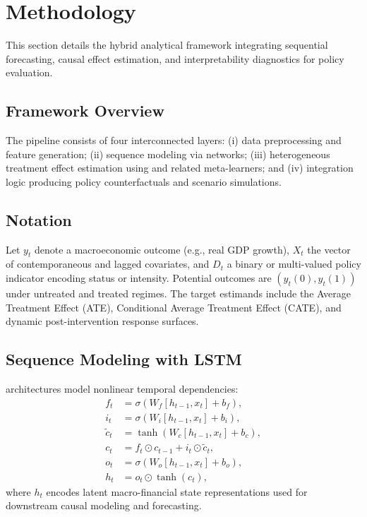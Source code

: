 \section{Methodology}\label{sec:methodology}
This section details the hybrid analytical framework integrating sequential forecasting, causal effect estimation, and interpretability diagnostics for \VAT{} policy evaluation.

\subsection{Framework Overview}
The pipeline consists of four interconnected layers: (i) data preprocessing and feature generation; (ii) sequence modeling via \LSTM{} networks; (iii) heterogeneous treatment effect estimation using \CF{} and related meta-learners; and (iv) integration logic producing policy counterfactuals and scenario simulations.

\subsection{Notation}
Let $y_t$ denote a macroeconomic outcome (e.g., real GDP growth), $X_t$ the vector of contemporaneous and lagged covariates, and $D_t$ a binary or multi-valued policy indicator encoding \VAT{} status or intensity. Potential outcomes are $(y_t(0), y_t(1))$ under untreated and treated regimes. The target estimands include the Average Treatment Effect (ATE), Conditional Average Treatment Effect (CATE), and dynamic post-intervention response surfaces.

\subsection{Sequence Modeling with LSTM}
\LSTM{} architectures model nonlinear temporal dependencies:
\begin{align}
  f_t &= \sigma(W_f [h_{t-1}, x_t] + b_f), \\
  i_t &= \sigma(W_i [h_{t-1}, x_t] + b_i), \\
  \tilde{c}_t &= \tanh(W_c [h_{t-1}, x_t] + b_c), \\
  c_t &= f_t \odot c_{t-1} + i_t \odot \tilde{c}_t, \\
  o_t &= \sigma(W_o [h_{t-1}, x_t] + b_o), \\
  h_t &= o_t \odot \tanh(c_t),
\end{align}
where $h_t$ encodes latent macro-financial state representations used for downstream causal modeling and forecasting.

